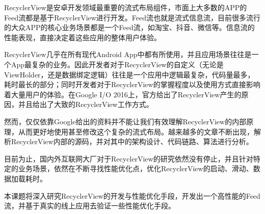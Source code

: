 RecyclerView是安卓开发领域最重要的流式布局组件，市面上大多数的APP的Feed流都是基于RecyclerView进行开发。Feed流也就是流式信息流，目前很多流行的大众APP的核心业务场景都是一个Feed流，如淘宝、抖音、微信等。信息流的性能表现，直接决定着这些应用的整体用户体验。

RecyclerView几乎在所有现代Android App中都有所使用，并且应用场景往往是一个App最复杂的业务。因此开发者对于RecyclerView的自定义（无论是ViewHolder，还是数据绑定逻辑）往往是一个应用中逻辑最复杂，代码量最多，耗时最长的部分；同时开发者对于RecyclerView的掌握程度以及使用方式直接影响着大量用户的体验。在Google I/O 2016上，官方给出了RecyclerView产生的原因，并且给出了大致的RecyclerView工作方式。

然而，仅仅依靠Google给出的资料并不能让我们有效理解RecyclerView的内部原理，从而更好地使用甚至修改这个复杂的流式布局。越来越多的文章不断出现，解析RecyclerView内部的源码，并对其中的架构设计、代码链路、算法进行分析。

目前为止，国内外互联网大厂对于RecyclerView的研究依然没有停止，并且针对特定的业务场景，依然在不断寻找性能优化点，优化RecyclerView的启动、滑动、数据加载耗时。

本课题将深入研究RecyclerView的开发与性能优化手段，开发出一个高性能的Feed流，并基于真实的线上应用去验证一些性能优化手段。